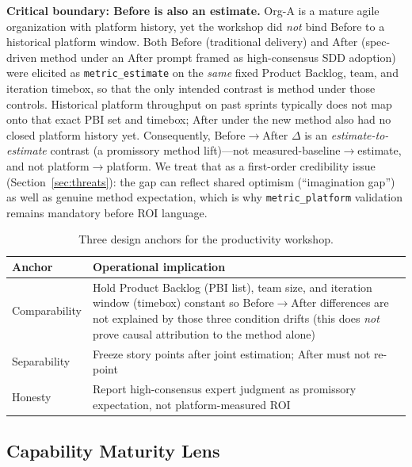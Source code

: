 \documentclass[10pt,conference]{IEEEtran}
\begin{document}
\textbf{Critical boundary: Before is also an estimate.}
Org-A is a mature agile organization with platform history, yet the workshop did \emph{not} bind Before to a historical platform window.
Both Before (traditional delivery) and After (spec-driven method under an After prompt framed as high-consensus SDD adoption) were elicited as \texttt{metric\_estimate} on the \emph{same} fixed Product Backlog, team, and iteration timebox, so that the only intended contrast is method under those controls.
Historical platform throughput on past sprints typically does not map onto that exact PBI set and timebox; After under the new method also had no closed platform history yet.
Consequently, Before$\rightarrow$After $\Delta$ is an \emph{estimate-to-estimate} contrast (a promissory method lift)---not measured-baseline$\rightarrow$estimate, and not platform$\rightarrow$platform.
We treat that as a first-order credibility issue (Section~\ref{sec:threats}): the gap can reflect shared optimism (``imagination gap'') as well as genuine method expectation, which is why \texttt{metric\_platform} validation remains mandatory before ROI language.


\begin{table}[!t]
\centering
\caption{Three design anchors for the productivity workshop.}
\label{tab:anchors}
\begin{tabular}{@{}lp{}@{}}
\toprule
Anchor & Operational implication \\
\midrule
Comparability & Hold Product Backlog (PBI list), team size, and iteration window (timebox) constant so Before$\rightarrow$After differences are not explained by those three condition drifts (this does \emph{not} prove causal attribution to the method alone) \\
Separability & Freeze story points after joint estimation; After must not re-point \\
Honesty & Report high-consensus expert judgment as promissory expectation, not platform-measured ROI \\
\bottomrule
\end{tabular}
\end{table}

\subsection{Capability Maturity Lens}
\label{sec:scheme-maturity}
\end{document}

